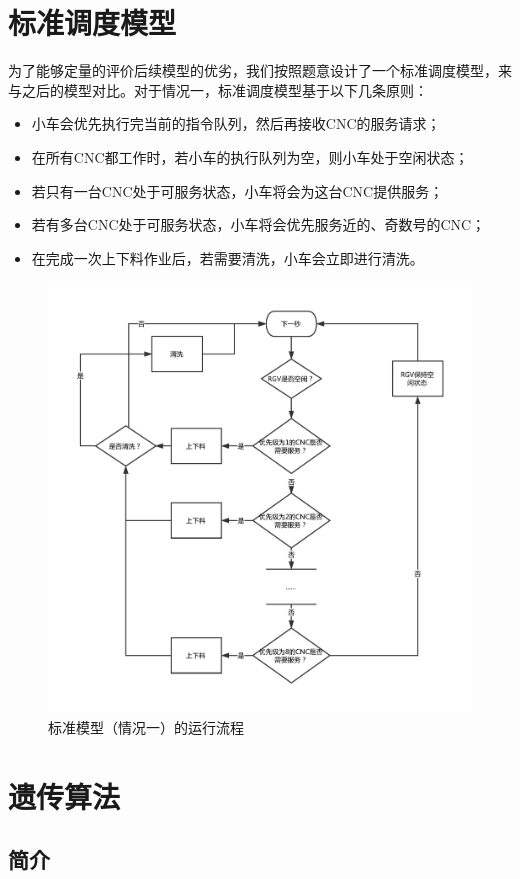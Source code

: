 \documentclass{cumcmthesis}
\begin{document}
	\section{标准调度模型}
	为了能够定量的评价后续模型的优劣，我们按照题意设计了一个标准调度模型，来与之后的模型对比。对于情况一，标准调度模型基于以下几条原则：
	\begin{itemize}
		\item 小车会优先执行完当前的指令队列，然后再接收CNC的服务请求；
		\item 在所有CNC都工作时，若小车的执行队列为空，则小车处于空闲状态；
		\item 若只有一台CNC处于可服务状态，小车将会为这台CNC提供服务；
		\item 若有多台CNC处于可服务状态，小车将会优先服务近的、奇数号的CNC；
		\item 在完成一次上下料作业后，若需要清洗，小车会立即进行清洗。
	\end{itemize}
	
	\begin{figure}
		\centering
		\includegraphics[width=.7\linewidth]{simple_model_1.pdf}
		\caption{标准模型（情况一）的运行流程}
	\end{figure}
	
	\section{遗传算法}
	
	\subsection{简介}
\end{document}
